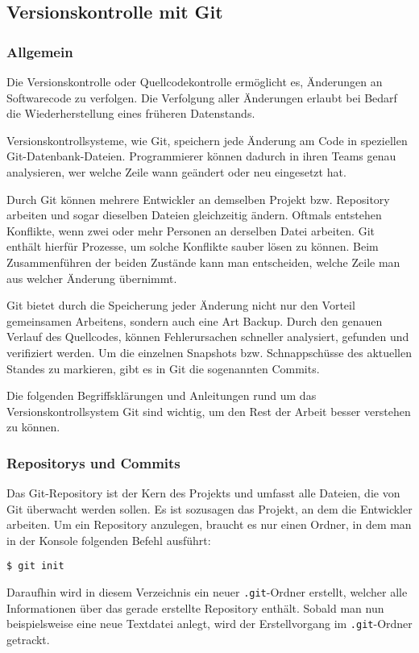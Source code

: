 \subsection{Versionskontrolle mit Git}
\subsubsection{Allgemein}
Die Versionskontrolle oder Quellcodekontrolle ermöglicht es, Änderungen an
Softwarecode zu verfolgen. Die Verfolgung aller Änderungen erlaubt bei Bedarf
die Wiederherstellung eines früheren Datenstands. \parencite{git-allgemein}

Versionskontrollsysteme, wie Git, speichern jede Änderung am Code in speziellen
Git-Datenbank-Dateien. Programmierer können dadurch in ihren Teams genau
analysieren, wer welche Zeile wann geändert oder neu eingesetzt hat.

Durch Git können mehrere Entwickler an demselben Projekt bzw. Repository
arbeiten und sogar dieselben Dateien gleichzeitig ändern. Oftmals entstehen
Konflikte, wenn zwei oder mehr Personen an derselben Datei arbeiten. Git enthält
hierfür Prozesse, um solche Konflikte sauber lösen zu können. Beim
Zusammenführen der beiden Zustände kann man entscheiden, welche Zeile man aus
welcher Änderung übernimmt.

Git bietet durch die Speicherung jeder Änderung nicht nur den Vorteil
gemeinsamen Arbeitens, sondern auch eine Art \glqq Backup\grqq{}. Durch den
genauen Verlauf des Quellcodes, können Fehlerursachen schneller analysiert,
gefunden und verifiziert werden. Um die einzelnen Snap\-shots bzw.
Schnappschüsse des aktuellen Standes zu markieren, gibt es in Git die
sogenannten Commits.

\newpage

Die folgenden Begriffsklärungen und Anleitungen rund um das
Versionskontrollsystem Git sind wichtig, um den Rest der Arbeit besser verstehen
zu können.

\subsubsection{Repositorys und Commits}
Das Git-Repository ist der Kern des Projekts und umfasst alle Dateien, die von
Git überwacht werden sollen. Es ist sozusagen das Projekt, an dem die Entwickler
arbeiten. Um ein Repository anzulegen, braucht es nur einen Ordner, in dem man
in der Konsole folgenden Befehl ausführt:
\begin{lstlisting}[style=Bash]
$ git init
\end{lstlisting}
Daraufhin wird in diesem Verzeichnis ein neuer \texttt{.git}-Ordner erstellt,
welcher alle Informationen über das gerade erstellte Repository enthält. Sobald
man nun beispielsweise eine neue Textdatei anlegt, wird der Erstellvorgang im
\texttt{.git}-Ordner getrackt.

